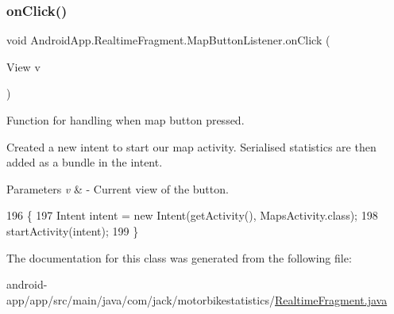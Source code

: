 \subsubsection{\texorpdfstring{on\+Click()}{onClick()}}
{\footnotesize\ttfamily void Android\+App.\+Realtime\+Fragment.\+Map\+Button\+Listener.\+on\+Click (\begin{DoxyParamCaption}\item[{View}]{v }\end{DoxyParamCaption})\hspace{0.3cm}{\ttfamily [inline]}}



Function for handling when map button pressed. 

Created a new intent to start our map activity. Serialised statistics are then added as a bundle in the intent.


\begin{DoxyParams}{Parameters}
{\em v} & -\/ Current view of the button. \\
\hline
\end{DoxyParams}

\begin{DoxyCode}
196                                   \{
197           Intent intent = \textcolor{keyword}{new} Intent(getActivity(), MapsActivity.class);
198           startActivity(intent);
199       \}
\end{DoxyCode}


The documentation for this class was generated from the following file\+:\begin{DoxyCompactItemize}
\item 
android-\/app/app/src/main/java/com/jack/motorbikestatistics/\hyperlink{_realtime_fragment_8java}{Realtime\+Fragment.\+java}\end{DoxyCompactItemize}
